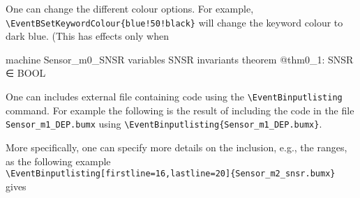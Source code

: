 One can change the different colour options.  For example, \verb|\EventBSetKeywordColour{blue!50!black}| will change the keyword colour to dark blue. (This has effects only when 
\begin{EventBcode}
machine Sensor_m0_SNSR
variables
	SNSR
invariants
	theorem @thm0_1: SNSR ∈ BOOL
\end{EventBcode}

One can includes external file containing \EventB code using the \verb|\EventBinputlisting| command.  For example the following is the result of including the code in the file \verb|Sensor_m1_DEP.bumx| using \verb|\EventBinputlisting{Sensor_m1_DEP.bumx}|.

More specifically, one can specify more details on the inclusion, e.g., the ranges, as the following example\\
\verb|\EventBinputlisting[firstline=16,lastline=20]{Sensor_m2_snsr.bumx}|
gives




